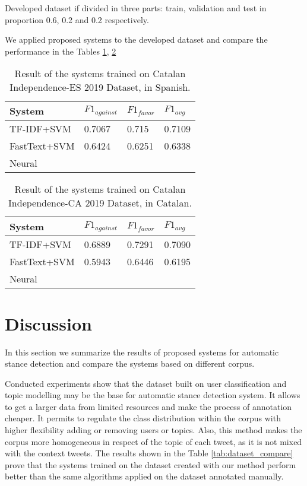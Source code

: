 \documentclass[10pt, a4paper]{article}
\begin{document}
Developed dataset if divided in three parts: train, validation and  test in proportion 0.6, 0.2 and 0.2 respectively. 

We applied proposed systems to the developed dataset and compare the performance in the Tables \ref{tab:result_indep_es}, \ref{tab:result_indep_ca} 


\begin{table}[ht]
\begin{tabularx}{\columnwidth}{|l|l|l|X|}
\hline
System       & $F1_{against}$ & $F1_{favor}$&$F1_{avg}$\\ \hline
TF-IDF+SVM   & 0.7067     & 0.715    & 0.7109 \\ \hline
FastText+SVM & 0.6424     & 0.6251   & 0.6338 \\ \hline
Neural       &            &          &        \\ \hline
\end{tabularx}
\caption{Result of the systems trained on Catalan Independence-ES 2019 Dataset, in Spanish. }
\label{tab:result_indep_es}
\end{table}

\begin{table}[h]
\begin{tabularx}{\columnwidth}{|l|l|l|X|}
\hline
System&$F1_{against}$&$F1_{favor}$&$F1_{avg}$ \\ \hline
TF-IDF+SVM&0.6889&0.7291&0.7090\\
\hline
FastText+SVM & 0.5943&0.6446&0.6195\\ 
\hline
Neural  &   &   & \\ 
\hline
\end{tabularx}
\caption{Result of the systems trained on Catalan Independence-CA 2019 Dataset, in Catalan.}
\label{tab:result_indep_ca}
\end{table}


\section{Discussion}
\label{sec:discussion}

In this section we summarize the results of proposed systems for automatic stance detection and compare the systems based on different corpus. 

Conducted experiments show that the dataset built on user classification and topic modelling may be the base for automatic stance detection system. It allows to get a larger data from limited resources and make the process of annotation cheaper. It permits to regulate the class distribution within the corpus with higher flexibility adding or removing users or topics. Also, this method makes the corpus more homogeneous in respect of the topic of each tweet, as it is not mixed with the context tweets. The results shown in the Table \ref{tab:dataset_compare} prove that the systems trained on the dataset created with our method perform better than the same algorithms applied on the dataset annotated manually. 
\end{document}
